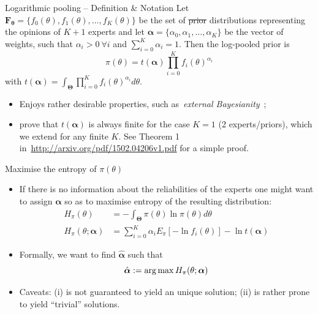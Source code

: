 \begin{frame}{Logarithmic pooling -- Definition \& Notation}
Let $\mathbf{F_\theta} = \{f_0(\theta), f_1(\theta), \ldots, f_K(\theta)\}$ be the set of \sout{prior} distributions representing the opinions of $K+1$ experts and let $\boldsymbol\alpha =\{\alpha_0, \alpha_1, \ldots, \alpha_K \}$ be the vector of weights, such that $\alpha_i > 0\: \forall i$ and $\sum_{i=0}^K \alpha_i = 1$.
Then the log-pooled prior is
\begin{equation}
\label{eq:logpool}
 \pi(\theta) = t(\boldsymbol\alpha) \prod_{i=0}^K f_i(\theta)^{\alpha_i} 
\end{equation}
with $t(\boldsymbol\alpha) = \int_{\boldsymbol\Theta}\prod_{i=0}^K f_i(\theta)^{\alpha_i}d\theta$.
\begin{itemize}
 \item Enjoys rather desirable properties, such as~\textit{external Bayesianity}~\citep{genest1986B};
 \item \cite{poole2000} prove that $t(\boldsymbol\alpha)$ is always finite for the case $K=1$ (2 experts/priors), which we extend for any finite $K$.
 See Theorem 1 in~\url{http://arxiv.org/pdf/1502.04206v1.pdf} for a simple proof.
\end{itemize}
\end{frame}
\begin{frame}{Maximise the entropy of $ \pi(\theta)$ }
 \begin{itemize}
  \item If there is no information about the reliabilities of the experts one might want to assign $\boldsymbol\alpha$ so as to maximise entropy of the resulting distribution:
  \begin{align*}
   H_{\pi}(\theta) &=-\int_{\boldsymbol\Theta}\pi(\theta)\ln\pi(\theta)d\theta \\
   H_{\pi}(\theta; \boldsymbol\alpha) &= \sum_{i=0}^{K} \alpha_i E_{\pi}[ - \ln f_i(\theta)] - \ln t(\boldsymbol\alpha)
  \end{align*}
  \item Formally, we want to find $\hat{\boldsymbol\alpha}$ such that
  \[\hat{\boldsymbol\alpha}:= \operatorname*{arg\,max} H_{\pi}(\theta; \boldsymbol\alpha)  \]
  \item Caveats: (i) is not guaranteed to yield an unique solution; (ii) is rather prone to yield ``trivial'' solutions.
 \end{itemize}
\end{frame}
